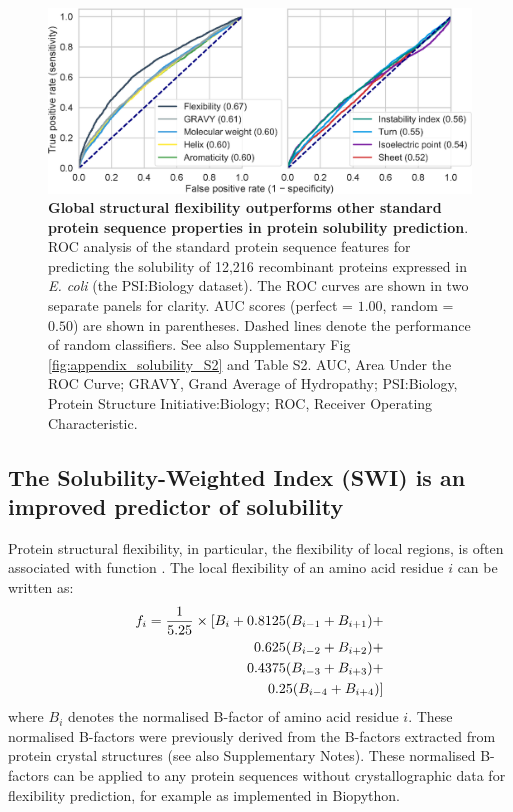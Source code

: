 \begin{figure}[!hbtp]
\centerline{\includegraphics[width=1\textwidth]{chapters/Solubility/Figures/fig1.eps}}
\caption[Global structural flexibility outperforms other standard protein sequence properties in protein solubility prediction.]{{\bf Global structural flexibility outperforms other standard protein sequence properties in protein solubility prediction}. ROC analysis of the standard protein sequence features for predicting the solubility of 12,216 recombinant proteins expressed in {\it E. coli} (the PSI:Biology dataset). The ROC curves are shown in two separate panels for clarity. AUC scores (perfect = $1.00$, random = $0.50$) are shown in parentheses. Dashed lines denote the performance of random classifiers. See also Supplementary Fig \ref{fig:appendix_solubility_S2} and Table S2. AUC, Area Under the ROC Curve; GRAVY, Grand Average of Hydropathy; PSI:Biology, Protein Structure Initiative:Biology; ROC, Receiver Operating Characteristic.}\label{fig:solubility_01}
\end{figure}

\subsection{The Solubility-Weighted Index (SWI) is an improved predictor of solubility}
Protein structural flexibility, in particular, the flexibility of local regions, is often associated with function \citep{Craveur2015-wg}. The local flexibility of an amino acid residue $i$ can be written as:
\begin{equation}
\begin{split}
f_i = \frac{1}{5.25} \times [B_i + 0.8125(B_{i-1} + B_{i+1}) + \\ 0.625(B_{i-2} + B_{i+2}) + \\0.4375(B_{i-3} +B_{i+3}) +\\ 0.25(B_{i-4} + B_{i+4})]
\end{split}
\label{eqn:local_flexibility}\vspace*{-10pt}
\end{equation}
where $B_i$ denotes the normalised B-factor of amino acid residue $i$. These normalised B-factors were previously derived from the B-factors extracted from protein crystal structures \citep{Karplus1985-ea,Ragone1989-bx,vihinen1994accuracy,Smith2003-gb} (see also Supplementary Notes). These normalised B-factors can be applied to any protein sequences without crystallographic data for flexibility prediction, for example as implemented in Biopython.


